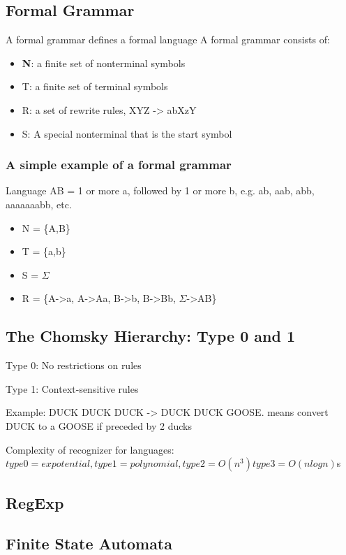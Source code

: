 \documentclass[a4paper]{article}
\begin{document}
\subsection{Formal Grammar}
\par{A formal grammar defines a formal language}
A formal grammar consists of:
\begin{itemize}
\item \textbf{N}: a finite set of nonterminal symbols
\item T: a finite set of terminal symbols
\item R: a set of rewrite rules, XYZ -> abXzY
\item S: A special nonterminal that is the start symbol
\end{itemize}


\subsubsection{A simple example of a formal grammar}
Language AB = 1 or more a, followed by 1 or more b, e.g. ab, aab, abb, aaaaaaabb, etc.
\begin{itemize}
\item N = \{A,B\}
\item T = \{a,b\}
\item S = $\Sigma$
\item R = \{A->a, A->Aa, B->b, B->Bb, $\Sigma$->AB\}
\end{itemize}

\subsection{The Chomsky Hierarchy: Type 0 and 1}
\par{Type 0: No restrictions on rules}
\par{Type 1: Context-sensitive rules}
\par{Example: DUCK DUCK DUCK -> DUCK DUCK GOOSE. means convert DUCK to a GOOSE if preceded by 2 ducks}
\par{Complexity of recognizer for languages: $type 0 = expotential, type 1 = polynomial, type 2 = O(n^3) type 3 = O(nlogn)$s}

\subsection{RegExp}
\par{}

\subsection{Finite State Automata}
\end{document}

